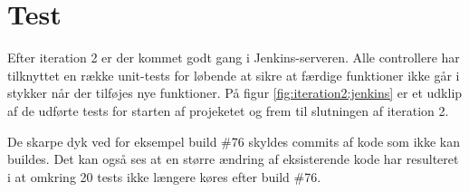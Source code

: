 \section{Test}

Efter iteration 2 er der kommet godt gang i Jenkins-serveren. Alle controllere har tilknyttet en række unit-tests for løbende at sikre at færdige funktioner ikke går i stykker når der tilføjes nye funktioner.
På figur \ref{fig:iteration2:jenkins} er et udklip af de udførte tests for starten af projeketet og frem til slutningen af iteration 2.


De skarpe dyk ved for eksempel build \#76 skyldes commits af kode som ikke kan buildes.
Det kan også ses at en større ændring af eksisterende kode har resulteret i at omkring 20 tests ikke længere køres efter build \#76.
